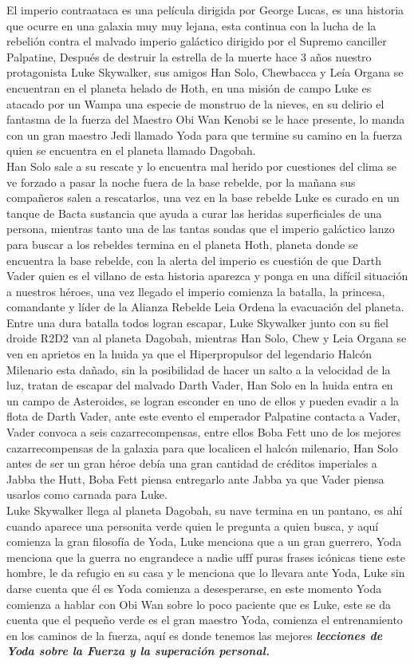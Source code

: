 \documentclass[11pt, a5paper]{article}
\begin{document}
{\footnotesize{El imperio contraataca es una película dirigida por George Lucas, es una historia que ocurre en una galaxia muy muy lejana, esta continua con la lucha de la rebelión contra el malvado imperio galáctico dirigido por el Supremo canciller Palpatine, Después de destruir la estrella de la muerte hace 3 años nuestro protagonista Luke Skywalker, sus amigos Han Solo, Chewbacca y Leía Organa se encuentran en el planeta  helado de Hoth, en una misión de campo Luke es atacado por un Wampa una especie de monstruo de la nieves, en su delirio el fantasma de la fuerza del Maestro Obi Wan Kenobi se le hace presente, lo manda con un gran maestro Jedi llamado Yoda para que termine su camino en la fuerza quien se encuentra en el planeta llamado Dagobah.\\
Han Solo sale a su rescate y lo encuentra mal herido por cuestiones del clima se ve forzado a pasar la noche fuera de la base rebelde, por la mañana sus compañeros salen a rescatarlos, una vez en la base rebelde Luke es curado en un tanque de Bacta sustancia que ayuda a curar las heridas superficiales de una persona, mientras tanto una de las tantas sondas que el  imperio galáctico lanzo para buscar a los rebeldes termina en el planeta Hoth, planeta donde se encuentra la base rebelde, con la alerta del imperio es cuestión de que Darth Vader quien es el villano de esta historia aparezca y ponga en una difícil situación a nuestros héroes, una vez llegado el imperio comienza la batalla, la princesa, comandante y líder de la Alianza Rebelde Leia Ordena la evacuación del planeta.\\
Entre una dura batalla todos logran escapar, Luke Skywalker junto con su fiel droide R2D2 van al planeta Dagobah, mientras Han Solo, Chew y Leia Organa se ven en aprietos en la huida ya que el Hiperpropulsor del legendario Halcón Milenario esta dañado, sin la posibilidad de hacer un salto a la velocidad de la luz, tratan de escapar del malvado Darth Vader, Han Solo en la huida entra en un campo de Asteroides, se logran esconder en uno de ellos y pueden evadir a la flota de Darth Vader, ante este evento el emperador Palpatine contacta a Vader, Vader convoca a seis cazarrecompensas, entre ellos Boba Fett uno de los mejores cazarrecompensas de la galaxia para que localicen el halcón milenario, Han Solo antes de ser un gran héroe debía una gran cantidad de créditos imperiales a Jabba the Hutt, Boba Fett piensa entregarlo ante Jabba ya que Vader piensa usarlos como carnada para Luke.\\
 Luke Skywalker llega al planeta Dagobah, su nave termina en un pantano, es ahí cuando aparece una personita verde quien le pregunta a quien busca, y aquí comienza la gran filosofía de Yoda, Luke menciona que a un gran guerrero, Yoda menciona que la guerra no engrandece a nadie ufff puras frases icónicas tiene este hombre, le da refugio en su casa y le menciona que lo llevara ante Yoda, Luke sin darse cuenta que él es Yoda comienza a desesperarse, en este momento Yoda comienza a hablar con Obi Wan sobre lo poco paciente que es Luke, este se da cuenta que el pequeño verde es el gran maestro Yoda, comienza el entrenamiento en los caminos de la fuerza, aquí es donde tenemos las mejores {\itshape\textbf{{lecciones de Yoda sobre la Fuerza y la superación personal.}}}\\
}}
\end{document}
